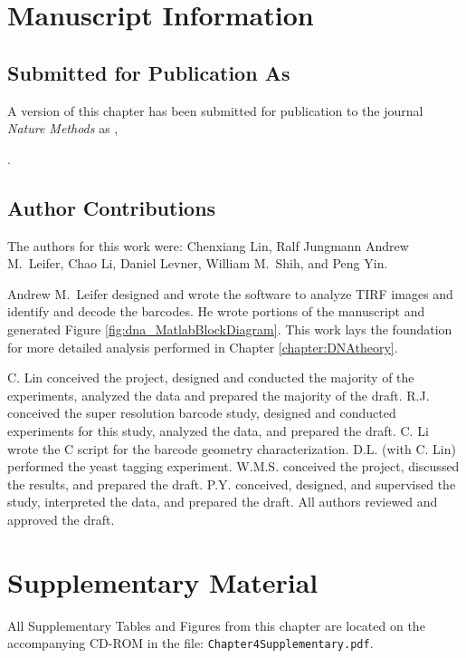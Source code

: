 


\section{Manuscript Information}
\subsection{Submitted for Publication As}
A version of this chapter has been submitted for publication to the journal \textit{Nature Methods}  as \citep{lin_sub-micrometer_2011},

.

\subsection{Author Contributions}
The authors for this work were: Chenxiang Lin, Ralf Jungmann  Andrew M.~Leifer,  Chao Li,  Daniel Levner,  William M.~Shih,  and Peng Yin.


Andrew M.~Leifer designed and wrote the software to analyze TIRF images and identify and decode the barcodes. He wrote portions of the manuscript and generated Figure \ref{fig:dna_MatlabBlockDiagram}. This work lays the foundation for more detailed analysis performed in Chapter \ref{chapter:DNAtheory}.

C. Lin conceived the project, designed and conducted the majority of the experiments, 
analyzed the data and prepared the majority of the draft. R.J. conceived the super 
resolution barcode study, designed and conducted experiments for this study, analyzed 
the data, and prepared the draft. C. Li wrote the C script for the barcode 
geometry characterization. D.L. (with C. Lin) performed the yeast tagging experiment. 
W.M.S. conceived the project, discussed the results, and prepared the draft. P.Y. 
conceived, designed, and supervised the study, interpreted the data, and prepared the 
draft. All authors reviewed and approved the draft. 


\section{Supplementary Material}
 All Supplementary Tables and Figures from this chapter are located on the accompanying CD-ROM in the file: \texttt{Chapter4Supplementary.pdf}. 
